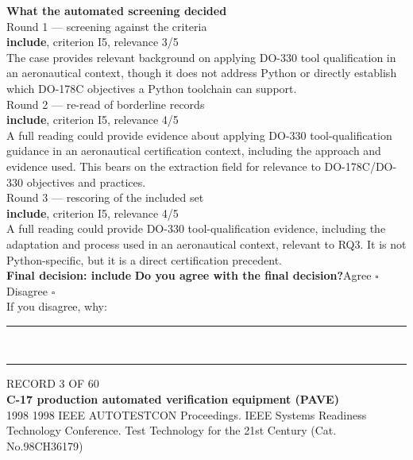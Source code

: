 \documentclass[11pt,a4paper]{article}
\begin{document}
{\small\textbf{What the automated screening decided}}\\[2mm]
{\footnotesize\color{soft}Round 1 --- screening against the criteria}\\[0.5mm]
{\small\textbf{include}, criterion I5, relevance 3/5}\\[0.5mm]
{\small The case provides relevant background on applying DO-330 tool qualification in an aeronautical context, though it does not address Python or directly establish which DO-178C objectives a Python toolchain can support.}\\[2.5mm]
{\footnotesize\color{soft}Round 2 --- re-read of borderline records}\\[0.5mm]
{\small\textbf{include}, criterion I5, relevance 4/5}\\[0.5mm]
{\small A full reading could provide evidence about applying DO-330 tool-qualification guidance in an aeronautical certification context, including the approach and evidence used. This bears on the extraction field for relevance to DO-178C/DO-330 objectives and practices.}\\[2.5mm]
{\footnotesize\color{soft}Round 3 --- rescoring of the included set}\\[0.5mm]
{\small\textbf{include}, criterion I5, relevance 4/5}\\[0.5mm]
{\small A full reading could provide DO-330 tool-qualification evidence, including the adaptation and process used in an aeronautical context, relevant to RQ3. It is not Python-specific, but it is a direct certification precedent.}\\[2.5mm]
{\small\textbf{Final decision: include}}
\vspace{2mm}
{\small\textbf{Do you agree with the final decision?}\quad{}Agree $\square$\qquad{}Disagree $\square$}\\[1mm]
{\footnotesize\color{soft}If you disagree, why:}\\[1mm]
\color{rule}\rule{\linewidth}{0.3pt}\\[3mm]\rule{\linewidth}{0.3pt}\color{black}
\clearpage
{\color{soft}\footnotesize RECORD 3 OF 60}\\[1mm]
{\large\bfseries C-17 production automated verification equipment (PAVE)}\\[1.5mm]
{\color{soft}\small 1998 \textperiodcentered{} 1998 IEEE AUTOTESTCON Proceedings. IEEE Systems Readiness Technology Conference. Test Technology for the 21st Century (Cat. No.98CH36179)}\\[2mm]
\end{document}

